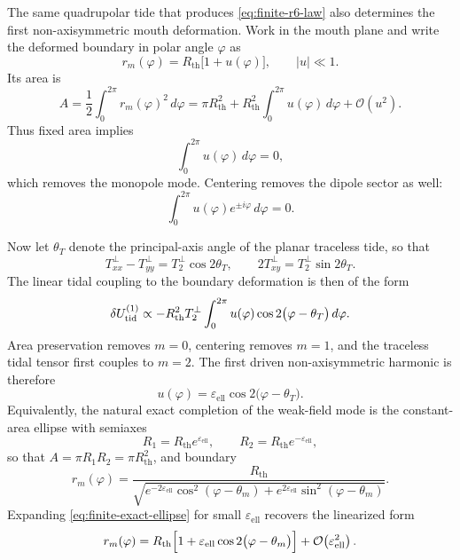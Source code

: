 \documentclass[11pt]{article}
\theoremstyle{plain}
\theoremstyle{definition}
\theoremstyle{remark}
\newcommand{\Rth}{R_{\mathrm{th}}}
\newcommand{\epsell}{\varepsilon_{\mathrm{ell}}}
\newcommand{\thmouth}{\theta_m}
\newcommand{\Order}[1]{\mathcal{O}\!\left(#1\right)}
\begin{document}
The same quadrupolar tide that produces \cref{eq:finite-r6-law} also determines the first non-axisymmetric mouth deformation. Work in the mouth plane and write the deformed boundary in polar angle $\varphi$ as
\begin{equation}
r_m(\varphi)=\Rth\bigl[1+u(\varphi)\bigr],
\qquad |u|\ll 1.
\label{eq:finite-mouth-boundary-linear}
\end{equation}
Its area is
\begin{equation}
A
=
\frac12\int_0^{2\pi}r_m(\varphi)^2\,d\varphi
=
\pi\Rth^2+\Rth^2\int_0^{2\pi}u(\varphi)\,d\varphi+\Order{u^2}.
\label{eq:finite-mouth-area}
\end{equation}
Thus fixed area implies
\begin{equation}
\int_0^{2\pi}u(\varphi)\,d\varphi=0,
\label{eq:finite-area-constraint}
\end{equation}
which removes the monopole mode. Centering removes the dipole sector as well:
\begin{equation}
\int_0^{2\pi}u(\varphi)e^{\pm i\varphi}\,d\varphi=0.
\label{eq:finite-centering-constraint}
\end{equation}

Now let $\theta_T$ denote the principal-axis angle of the planar traceless tide, so that
\begin{equation}
T_{xx}^\perp-T_{yy}^\perp = T_2^\perp\cos 2\theta_T,
\qquad
2T_{xy}^\perp = T_2^\perp\sin 2\theta_T.
\label{eq:finite-planar-tide-axis}
\end{equation}
The linear tidal coupling to the boundary deformation is then of the form
\begin{equation}
\delta U_{\rm tid}^{(1)}
\propto
-\Rth^2T_2^\perp
\int_0^{2\pi}u(\varphi)\cos 2\bigl(\varphi-\theta_T\bigr)\,d\varphi.
\label{eq:finite-linear-mouth-coupling}
\end{equation}
Area preservation removes $m=0$, centering removes $m=1$, and the traceless tidal tensor first couples to $m=2$. The first driven non-axisymmetric harmonic is therefore
\begin{equation}
u(\varphi)=\epsell\cos 2\bigl(\varphi-\theta_T\bigr).
\label{eq:finite-first-harmonic}
\end{equation}
Equivalently, the natural exact completion of the weak-field mode is the constant-area ellipse with semiaxes
\begin{equation}
R_1=\Rth e^{\epsell},
\qquad
R_2=\Rth e^{-\epsell},
\label{eq:finite-ellipse-semiaxes}
\end{equation}
so that $A=\pi R_1R_2=\pi\Rth^2$, and boundary
\begin{equation}
r_m(\varphi)
=
\frac{\Rth}{\sqrt{e^{-2\epsell}\cos^2(\varphi-\thmouth)+e^{2\epsell}\sin^2(\varphi-\thmouth)}}.
\label{eq:finite-exact-ellipse}
\end{equation}
Expanding \cref{eq:finite-exact-ellipse} for small $\epsell$ recovers the linearized form
\begin{equation}
r_m(\varphi)
=
\Rth\Bigl[1+\epsell\cos 2\bigl(\varphi-\thmouth\bigr)\Bigr]+\Order{\epsell^2}.
\label{eq:finite-ellipse-linearized}
\end{equation}
\end{document}
